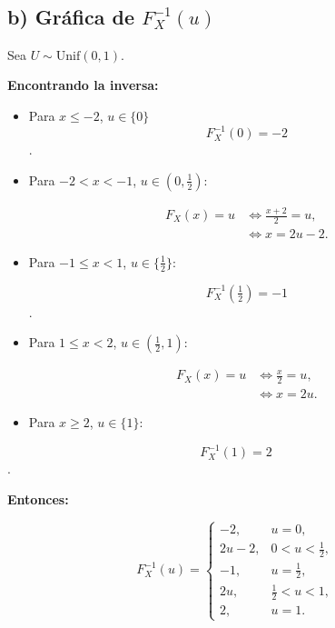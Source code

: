 \documentclass[10pt,a4paper]{article}
\begin{document}
    \begin{center}
    \end{center}
    { \hspace*{\fill} \\}
    
    \hypertarget{b-gruxe1fica-de-f_x-1u}{%
\subsection{\texorpdfstring{b) Gráfica de
\(F_{X}^{-1}(u)\)}{b) Gráfica de F\_\{X\}\^{}\{-1\}(u)}}\label{b-gruxe1fica-de-f_x-1u}}

    Sea \textbf{\(U\sim\mathrm{Unif}(0,1)\)}.

\textbf{Encontrando la inversa:}

\begin{itemize}
\item
  Para \(x\le -2\), \(u\in\{0\}\) \[
  F_X^{-1}(0)=-2
  \].
\item
  Para \(-2<x<-1\), \(u\in(0,\tfrac12)\):

  \[
  \begin{aligned}
  F_X(x)=u &\iff \frac{x+2}{2}=u,\\
           &\iff x=2u-2.
  \end{aligned}
  \]
\item
  Para \(-1\le x<1\), \(u\in\{\tfrac12\}\):

  \[
  F_X^{-1}(\tfrac12)=-1
  \].
\item
  Para \(1\le x<2\), \(u\in(\tfrac12,1)\):

  \[
  \begin{aligned}
  F_X(x)=u &\iff \frac{x}{2}=u,\\
           &\iff x=2u.
  \end{aligned}
  \]
\item
  Para \(x\ge 2\), \(u\in\{1\}\):
\end{itemize}

\[
F_X^{-1}(1)=2
\].

\textbf{Entonces:}

\[
F_X^{-1}(u)=
\begin{cases}
-2,& u=0,\\[4pt]
2u-2,& 0<u<\tfrac12,\\[4pt]
-1,& u=\tfrac12,\\[4pt]
2u,& \tfrac12<u<1,\\[4pt]
2,& u=1.
\end{cases}
\]
\end{document}
